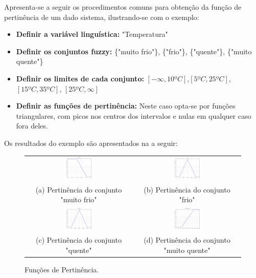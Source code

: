Apresenta-se a seguir os procedimentos comuns para obtenção da função de pertinência de um dado sistema, ilustrando-se com o exemplo:
\begin{itemize}
	\item \textbf{Definir a variável linguística:} "Temperatura"
	\item \textbf{Definir os conjuntos fuzzy:} \{"muito frio"\}, \{"frio"\}, \{"quente"\}, \{"muito quente"\}
	\item \textbf{Definir os limites de cada conjunto:} $[-\infty,10ºC]$,$ [5ºC,25ºC]$, $[15ºC,35ºC]$, $[25ºC,\infty]$ 
	\item \textbf{Definir as funções de pertinência:} Neste caso opta-se por funções triangulares, com picos nos centros dos intervalos e nulas em qualquer caso fora deles.
\end{itemize}

Os resultados do exemplo são apresentados na  a seguir:
\begin{figure}[H]
	\centering
	\begin{tabular}{cc}
		\includegraphics[width=0.3\textwidth,keepaspectratio]{img/pert_mf.png} &
		\includegraphics[width=0.3\textwidth,keepaspectratio]{img/pert_f.png} \\
		(a) Pertinência do conjunto "muito frio" &
		(b) Pertinência do conjunto "frio" \\
		\includegraphics[width=0.3\textwidth,keepaspectratio]{img/pert_q.png} &
		\includegraphics[width=0.3\textwidth,keepaspectratio]{img/pert_mq.png} \\
		(c) Pertinência do conjunto "quente" &
		(d) Pertinência do conjunto "muito quente"
	\end{tabular}
	\caption{\label{figPertEx} Funções de Pertinência.}
\end{figure}	

